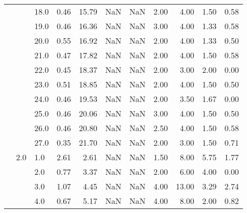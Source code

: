\begin{tabular}{lllrrrrrrrr}
       &     & 18.0 &      0.46 &      15.79 &               NaN &                NaN & 2.00 &   4.00 &             1.50 &                         0.58 \\
       &     & 19.0 &      0.46 &      16.36 &               NaN &                NaN & 3.00 &   4.00 &             1.33 &                         0.58 \\
       &     & 20.0 &      0.55 &      16.92 &               NaN &                NaN & 2.00 &   4.00 &             1.33 &                         0.50 \\
       &     & 21.0 &      0.47 &      17.82 &               NaN &                NaN & 2.00 &   4.00 &             1.50 &                         0.58 \\
       &     & 22.0 &      0.45 &      18.37 &               NaN &                NaN & 2.00 &   3.00 &             2.00 &                         0.00 \\
       &     & 23.0 &      0.51 &      18.85 &               NaN &                NaN & 2.00 &   4.00 &             1.50 &                         0.50 \\
       &     & 24.0 &      0.46 &      19.53 &               NaN &                NaN & 2.00 &   3.50 &             1.67 &                         0.00 \\
       &     & 25.0 &      0.46 &      20.06 &               NaN &                NaN & 3.00 &   4.00 &             1.50 &                         0.50 \\
       &     & 26.0 &      0.46 &      20.80 &               NaN &                NaN & 2.50 &   4.00 &             1.50 &                         0.58 \\
       &     & 27.0 &      0.35 &      21.70 &               NaN &                NaN & 2.00 &   3.00 &             1.50 &                         0.71 \\
       & 2.0 & 1.0  &      2.61 &       2.61 &               NaN &                NaN & 1.50 &   8.00 &             5.75 &                         1.77 \\
       &     & 2.0  &      0.77 &       3.37 &               NaN &                NaN & 2.00 &   6.00 &             4.00 &                         0.00 \\
       &     & 3.0  &      1.07 &       4.45 &               NaN &                NaN & 4.00 &  13.00 &             3.29 &                         2.74 \\
       &     & 4.0  &      0.67 &       5.17 &               NaN &                NaN & 4.00 &   8.00 &             2.00 &                         0.82 \\

\end{tabular}
